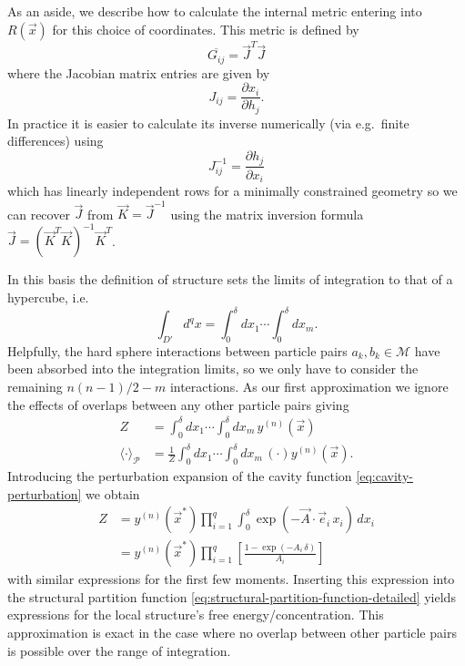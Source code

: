 \documentclass[11pt,twoside]{report}
\begin{document}
As an aside, we describe how to calculate the internal metric entering into $R(\vec{x})$ for this choice of coordinates.
This metric is defined by
\begin{equation*}
  \overline{G_{ij}} = \vec{J}^T \vec{J}
\end{equation*}
where the Jacobian matrix entries are given by
\begin{equation*}
  J_{ij} = \frac{\partial x_i}{\partial h_j}.
\end{equation*}
In practice it is easier to calculate its inverse numerically (via e.g.\ finite differences) using
\begin{equation*}
  J_{ij}^{-1}
  = \frac{\partial h_j}{\partial x_i}
\end{equation*}
which has linearly independent rows for a minimally constrained geometry so we can recover $\vec{J}$ from $\vec{K} = \vec{J}^{-1}$ using the matrix inversion formula $\vec{J} = (\vec{K}^T\vec{K})^{-1} \vec{K}^T$.

In this basis the definition of structure sets the limits of integration to that of a hypercube, i.e.\
\begin{equation*}
  \int_{D'} d^q x
  =
  \int_0^\delta dx_1 \cdots \int_0^\delta dx_m.
\end{equation*}
Helpfully, the hard sphere interactions between particle pairs $a_k,b_k \in \mathcal{M}$ have been absorbed into the integration limits, so we only have to consider the remaining $n(n-1)/2 - m$ interactions.
As our first approximation we ignore the effects of overlaps between any other particle pairs giving
\begin{subequations}
  \begin{align}
    Z
    &=
    \int_0^\delta dx_1 \cdots \int_0^\delta dx_m
    \, y^{(n)}(\vec{x})
    \\
    \langle \cdot \rangle_\mathcal{P}
    &=
    \frac{1}{Z}
    \int_0^\delta dx_1 \cdots \int_0^\delta dx_m
    \, (\cdot) y^{(n)}(\vec{x}).
  \end{align}
\end{subequations}
Introducing the perturbation expansion of the cavity function \eqref{eq:cavity-perturbation} we obtain
\begin{equation}
  \begin{split}
    Z
    &=
    y^{(n)}(\vec{x}^*)
    \prod_{i=1}^q
    \int_0^\delta
    \exp{\left( -\vec{A} \cdot \vec{e}_i \, x_i \right)}
    \, dx_i
    \\ &=
    y^{(n)}(\vec{x}^*)
    \prod_{i=1}^q
    \left[
    \frac{1 - \exp{\left( -A_i \, \delta \right)}}{A_i}
    \right]
  \end{split}
\end{equation}
with similar expressions for the first few moments.
Inserting this expression into the structural partition function \eqref{eq:structural-partition-function-detailed} yields expressions for the local structure's free energy/concentration.
This approximation is exact in the case where no overlap between other particle pairs is possible over the range of integration.
\end{document}
